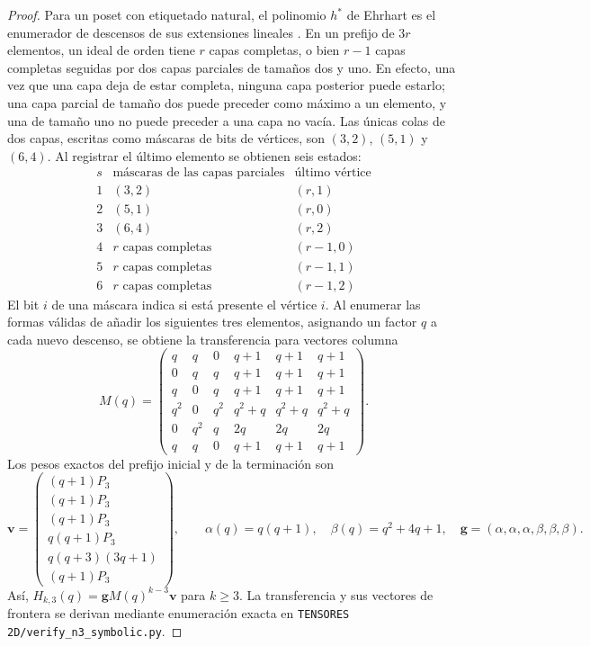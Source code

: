 \documentclass[11pt,a4paper]{article}
\theoremstyle{definition}
\begin{document}
\begin{proof}
Para un poset con etiquetado natural, el polinomio $h^*$ de Ehrhart es
el enumerador de descensos de sus extensiones lineales
\cite{Stanley1986}. En un prefijo de $3r$ elementos, un ideal de orden
tiene $r$ capas completas, o bien $r-1$ capas completas seguidas por dos
capas parciales de tamaños dos y uno. En efecto, una vez que una capa deja de estar completa, ninguna capa
posterior puede estarlo; una capa parcial de tamaño dos puede
preceder como máximo a un elemento, y una de tamaño uno no puede
preceder a una capa no vacía. Las únicas colas de dos capas, escritas
como máscaras de bits de vértices, son $(3,2)$, $(5,1)$ y $(6,4)$.
Al registrar el último elemento se obtienen seis estados:
\[
\begin{array}{c|c|c}
s&\text{máscaras de las capas parciales}&\text{último vértice}\\ \hline
1&(3,2)&(r,1)\\
2&(5,1)&(r,0)\\
3&(6,4)&(r,2)\\
4&\text{$r$ capas completas}&(r-1,0)\\
5&\text{$r$ capas completas}&(r-1,1)\\
6&\text{$r$ capas completas}&(r-1,2)
\end{array}
\]
El bit $i$ de una máscara indica si está presente el vértice $i$.
Al enumerar las formas válidas de añadir los siguientes tres elementos,
asignando un factor $q$ a cada nuevo descenso, se obtiene la transferencia
para vectores columna
\[
M(q)=
\begin{pmatrix}
q&q&0&q+1&q+1&q+1\\
0&q&q&q+1&q+1&q+1\\
q&0&q&q+1&q+1&q+1\\
q^2&0&q^2&q^2+q&q^2+q&q^2+q\\
0&q^2&q&2q&2q&2q\\
q&q&0&q+1&q+1&q+1
\end{pmatrix}.
\]
Los pesos exactos del prefijo inicial y de la terminación son
\[
\mathbf v=
\begin{pmatrix}
(q+1)P_3\\(q+1)P_3\\(q+1)P_3\\
q(q+1)P_3\\q(q+3)(3q+1)\\(q+1)P_3
\end{pmatrix},
\qquad
\alpha(q)=q(q+1),\quad \beta(q)=q^2+4q+1,\quad
\mathbf g=(\alpha,\alpha,\alpha,\beta,\beta,\beta).
\]
Así, $H_{k,3}(q)=\mathbf gM(q)^{k-3}\mathbf v$ para $k\ge3$.
La transferencia y sus vectores de frontera se derivan mediante
enumeración exacta en \texttt{TENSORES 2D/verify\_n3\_symbolic.py}.


\end{proof}
\end{document}
